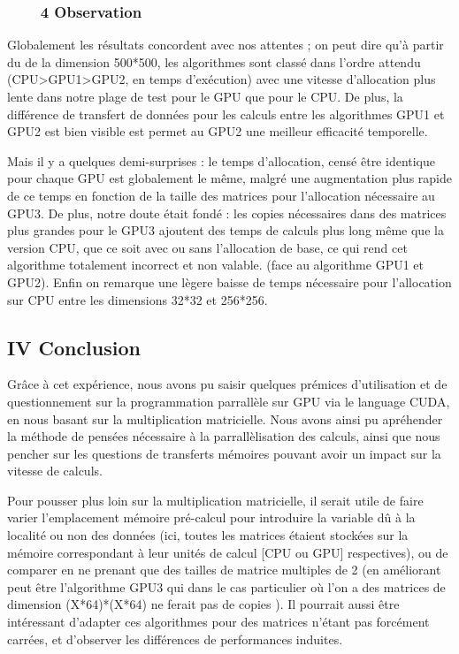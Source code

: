 \documentclass[]{article}
\begin{document}
\subsubsection{~~~~4 Observation}\label{observation}

Globalement les résultats concordent avec nos attentes ; on peut dire
qu'à partir du de la dimension 500*500, les algorithmes sont classé dans
l'ordre attendu (CPU\textgreater{}GPU1\textgreater{}GPU2, en temps
d'exécution) avec une vitesse d'allocation plus lente dans notre plage
de test pour le GPU que pour le CPU. De plus, la différence de transfert
de données pour les calculs entre les algorithmes GPU1 et GPU2 est bien
visible est permet au GPU2 une meilleur efficacité temporelle.

Mais il y a quelques demi-surprises : le temps d'allocation, censé être
identique pour chaque GPU est globalement le même, malgré une
augmentation plus rapide de ce temps en fonction de la taille des
matrices pour l'allocation nécessaire au GPU3. De plus, notre doute
était fondé : les copies nécessaires dans des matrices plus grandes pour
le GPU3 ajoutent des temps de calculs plus long même que la version CPU,
que ce soit avec ou sans l'allocation de base, ce qui rend cet
algorithme totalement incorrect et non valable. (face au algorithme GPU1
et GPU2). Enfin on remarque une lègere baisse de temps nécessaire pour
l'allocation sur CPU entre les dimensions 32*32 et 256*256.

\subsection{IV Conclusion}\label{iv-conclusion}

Grâce à cet expérience, nous avons pu saisir quelques prémices
d'utilisation et de questionnement sur la programmation parrallèle sur
GPU via le language CUDA, en nous basant sur la multiplication
matricielle. Nous avons ainsi pu apréhender la méthode de pensées
nécessaire à la parrallèlisation des calculs, ainsi que nous pencher sur
les questions de transferts mémoires pouvant avoir un impact sur la
vitesse de calculs.

Pour pousser plus loin sur la multiplication matricielle, il serait
utile de faire varier l'emplacement mémoire pré-calcul pour introduire
la variable dû à la localité ou non des données (ici, toutes les
matrices étaient stockées sur la mémoire correspondant à leur unités de
calcul {[}CPU ou GPU{]} respectives), ou de comparer en ne prenant que
des tailles de matrice multiples de 2 (en améliorant peut être
l'algorithme GPU3 qui dans le cas particulier où l'on a des matrices de
dimension (X*64)*(X*64) ne ferait pas de copies ). Il pourrait aussi
être intéressant d'adapter ces algorithmes pour des matrices n'étant pas
forcément carrées, et d'observer les différences de performances
induites.
\end{document}
